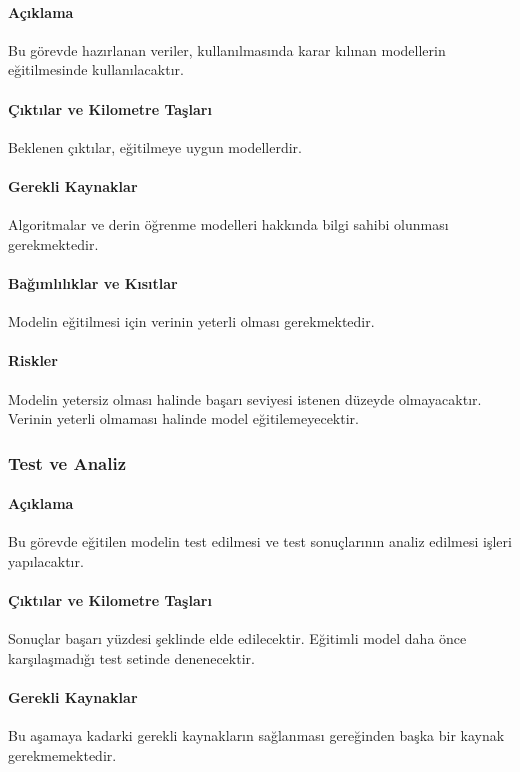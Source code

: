 \documentclass[12pt,a4paper]{article}
\begin{document}
   \paragraph{Açıklama}
   Bu görevde hazırlanan veriler, kullanılmasında karar kılınan modellerin eğitilmesinde kullanılacaktır.

   \paragraph{Çıktılar ve Kilometre Taşları}
   Beklenen çıktılar, eğitilmeye uygun modellerdir.
   
   \paragraph{Gerekli Kaynaklar}
   Algoritmalar ve derin öğrenme modelleri hakkında bilgi sahibi olunması gerekmektedir.

   \paragraph{Bağımlılıklar ve Kısıtlar}
   Modelin eğitilmesi için verinin yeterli olması gerekmektedir. 

   \paragraph{Riskler}
   Modelin yetersiz olması halinde başarı seviyesi istenen düzeyde olmayacaktır. Verinin yeterli olmaması halinde model eğitilemeyecektir.


   \subsubsection{Test ve Analiz}
   \paragraph{Açıklama}
   Bu görevde eğitilen modelin test edilmesi ve test sonuçlarının analiz edilmesi işleri yapılacaktır.

   \paragraph{Çıktılar ve Kilometre Taşları}
   Sonuçlar başarı yüzdesi şeklinde elde edilecektir. Eğitimli model daha önce karşılaşmadığı test setinde denenecektir.

   \paragraph{Gerekli Kaynaklar}
   Bu aşamaya kadarki gerekli kaynakların sağlanması gereğinden başka bir kaynak gerekmemektedir.
\end{document}
